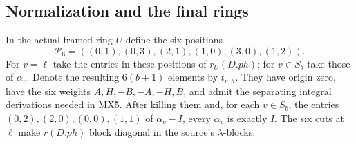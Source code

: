 
\subsection{Normalization and the final rings}

\begin{proposition}
\label{claim:MX6}
In the actual framed ring $U$ define the six positions
\[
 \mathcal P_6=((0,1),(0,3),(2,1),(1,0),(3,0),(1,2)).
 \tag{MX.23}
\]
For $v=\ell$ take the entries in these positions of
$r_U(D.ph)$; for $v\in S_b$ take those of $\alpha_v$.
Denote the resulting $6(b+1)$ elements by $t_{v,h}$.
They have origin zero, have the six weights
$A,H,-B,-A,-H,B$, and admit the separating integral
derivations needed in MX5.
After killing them and, for each $v\in S_b$, the entries
$(0,2),(2,0),(0,0),(1,1)$ of $\alpha_v-I$, every
$\alpha_v$ is exactly $I$.
The six cuts at $\ell$ make $r(D.ph)$ block diagonal in
the source's $\lambda$-blocks.
\end{proposition}
